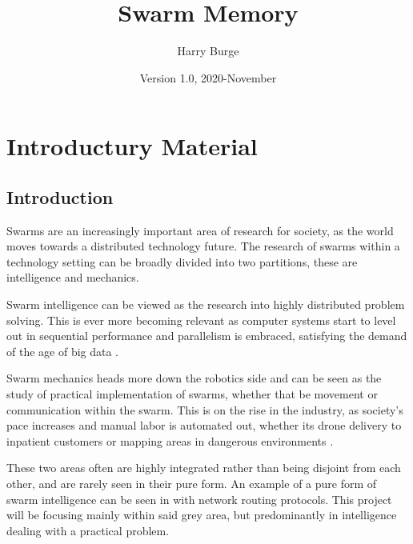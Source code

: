 \documentclass{UoYCSproject}
\author{Harry Burge}
\title{Swarm Memory}
\date{Version 1.0, 2020-November}
\begin{document}
\maketitle
\listoffigures
\listoftables



\begin{summary}

\end{summary}


\chapter{Introductury Material}
\label{cha:Introductury Material}

\section{Introduction}
\label{sec:Introduction}

Swarms are an increasingly important area of research for society, as the world moves towards a distributed technology future. 
The research of swarms within a technology setting can be broadly divided into two partitions, these are intelligence and mechanics. 

Swarm intelligence can be viewed as the research into highly distributed problem solving\cite{Cognitive maps mine detection, Swarm intellegiegence}. 
This is ever more becoming relevant as computer systems start to level out in sequential performance \cite{CPU speed} and parallelism is embraced, satisfying the demand of the age of big data \cite{Avalability storage}.

Swarm mechanics heads more down the robotics side and can be seen as the study of practical implementation of swarms, whether that be movement or communication within the swarm.
This is on the rise in the industry, as society's pace increases and manual labor is automated out, whether its drone delivery to inpatient customers or mapping areas in dangerous environments \cite{Swarm robotics reviewed}.

These two areas often are highly integrated rather than being disjoint from each other, and are rarely seen in their pure form. 
An example of a pure form of swarm intelligence can be seen in \cite{Swarm intellegiegence} with network routing protocols. 
This project will be focusing mainly within said grey area, but predominantly in intelligence dealing with a practical problem.
\end{document}
